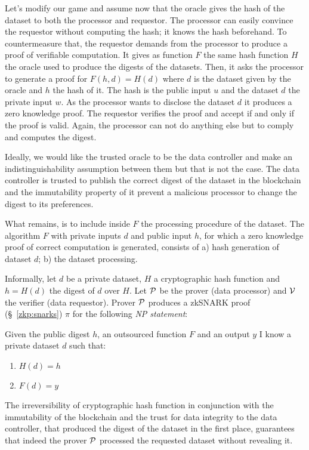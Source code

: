 Let's modify our game and assume now that the oracle gives the hash of the dataset to both the processor and requestor. The processor can easily convince the requestor without computing the hash; it knows the hash beforehand. To countermeasure that, the requestor demands from the processor to produce a proof of verifiable computation. It gives as function $F$ the same hash function $H$ the oracle used to produce the digests of the datasets. Then, it asks the processor to generate a proof for $F(h, d) = H(d)$ where $d$ is the dataset given by the oracle and $h$ the hash of it. The hash is the public input $u$ and the dataset $d$ the private input $w$. As the processor wants to disclose the dataset $d$ it produces a zero knowledge proof. The requestor verifies the proof and accept if and only if the proof is valid. Again, the processor can not do anything else but to comply and computes the digest.

Ideally, we would like the trusted oracle to be the data controller and make an indistinguishability assumption between them but that is not the case. The data controller is trusted to publish the correct digest of the dataset in the blockchain and the immutability property of it prevent a malicious processor to change the digest to its preferences.

What remains, is to include inside $F$ the processing procedure of the dataset. The algorithm $F$ with private inputs $d$ and public input $h$, for which a zero knowledge proof of correct computation is generated, consists of a) hash generation of dataset $d$; b) the dataset processing.

Informally, let $d$ be a private dataset, $H$ a cryptographic hash function and $h = H(d)$ the digest of $d$ over $H$. Let $\mathcal{P}$ be the prover (data processor) and $\mathcal{V}$ the verifier (data requestor). Prover $\mathcal{P}$ produces a zkSNARK proof (§~\ref{zkp:snarks}) $\pi$ for the following \textit{NP statement}:

Given the public digest $h$, an outsourced function $F$ and an output $y$ I know a private dataset $d$ such that:
  \begin{enumerate}
    \item $H(d) = h$
    \item $F(d) = y$
  \end{enumerate}

The irreversibility of cryptographic hash function in conjunction with the immutability of the blockchain and the trust for data integrity to the data controller, that produced the digest of the dataset in the first place, guarantees that indeed the prover $\mathcal{P}$ processed the requested dataset without revealing it.

